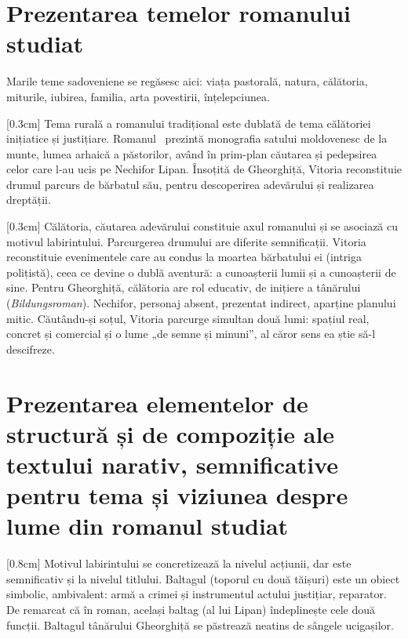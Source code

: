 \section{Prezentarea temelor romanului studiat}

Marile teme sadoveniene se regăsesc aici: viața pastorală, natura, călătoria, miturile, iubirea, familia, arta povestirii, înțelepciunea.

[0.3cm]
Tema rurală a romanului tradițional este dublată de tema călătoriei inițiatice și justițiare. Romanul \operatitle\ prezintă monografia satului moldovenesc de la munte, lumea arhaică a păstorilor, având în prim-plan căutarea și pedepsirea celor care l-au ucis pe Nechifor Lipan. Însoțită de Gheorghiță, Vitoria reconstituie drumul parcurs de bărbatul său, pentru descoperirea adevărului și realizarea dreptății.

[0.3cm]
Călătoria, căutarea adevărului constituie axul romanului și se asociază cu motivul labirintului. Parcurgerea drumului are diferite semnificații. Vitoria reconstituie evenimentele care au condus la moartea bărbatului ei (intriga polițistă), ceea ce devine o dublă aventură: a cunoașterii lumii și a cunoașterii de sine. Pentru Gheorghiță, călătoria are rol educativ, de inițiere a tânărului (\textit{Bildungsroman}). Nechifor, personaj absent, prezentat indirect, aparține planului mitic. Căutându-și soțul, Vitoria parcurge simultan două lumi: spațiul real, concret și comercial și o lume „de semne și minuni”, al căror sens ea știe să-l descifreze.


\section{Prezentarea elementelor de structură și de compoziție ale textului narativ, semnificative pentru tema și viziunea despre lume din romanul studiat}%

[0.8cm]
Motivul labirintului se concretizează la nivelul acțiunii, dar este semnificativ și la nivelul titlului. Baltagul (toporul cu două tăișuri) este un obiect simbolic, ambivalent: armă a crimei și instrumentul actului justițiar, reparator. De remarcat că în roman, același baltag (al lui Lipan) îndeplinește cele două funcții. Baltagul tânărului Gheorghiță se păstrează neatins de sângele ucigașilor.

